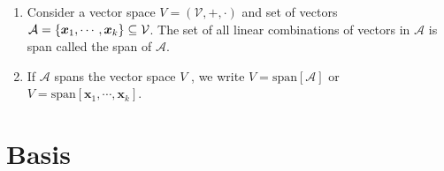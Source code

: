\begin{enumerate}
    \item
    \begin{definition}[Span]
        Consider a vector space $V = (\mathcal{V}, +, \cdot)$ and set of vectors $\mathcal{A} = \left\{\bm{x}_1, \cdots , \bm{x}_k\right\} \subseteq \mathcal{V}$. 
        The set of all linear combinations of vectors in $\mathcal{A}$ is span called the span of $\mathcal{A}$.
        \hfill \cite{mfml/book/mml/Deisenroth-Faisal-Ong}
    \end{definition}

    \item If $\mathcal{A}$ spans the vector space $V$ , we write $V = \text{span}[\mathcal{A}]$ or $V = \text{span}[\bm{x}_1, \cdots , \bm{x}_k]$.
    \hfill \cite{mfml/book/mml/Deisenroth-Faisal-Ong}
\end{enumerate}





\section{Basis}

